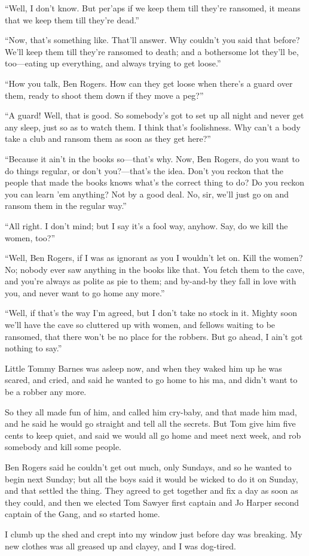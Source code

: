 \documentclass[10pt,a4paper]{article}
\begin{document}
“Well, I don’t know. But per’aps if we keep them till they’re ransomed, it means that we keep them till they’re dead.”

“Now, that’s something like. That’ll answer. Why couldn’t you said that before? We’ll keep them till they’re ransomed to death; and a bothersome lot they’ll be, too—eating up everything, and always trying to get loose.”

“How you talk, Ben Rogers. How can they get loose when there’s a guard over them, ready to shoot them down if they move a peg?”

“A guard! Well, that is good. So somebody’s got to set up all night and never get any sleep, just so as to watch them. I think that’s foolishness. Why can’t a body take a club and ransom them as soon as they get here?”

“Because it ain’t in the books so—that’s why. Now, Ben Rogers, do you want to do things regular, or don’t you?—that’s the idea. Don’t you reckon that the people that made the books knows what’s the correct thing to do? Do you reckon you can learn ’em anything? Not by a good deal. No, sir, we’ll just go on and ransom them in the regular way.”

“All right. I don’t mind; but I say it’s a fool way, anyhow. Say, do we kill the women, too?”

“Well, Ben Rogers, if I was as ignorant as you I wouldn’t let on. Kill the women? No; nobody ever saw anything in the books like that. You fetch them to the cave, and you’re always as polite as pie to them; and by-and-by they fall in love with you, and never want to go home any more.”

“Well, if that’s the way I’m agreed, but I don’t take no stock in it. Mighty soon we’ll have the cave so cluttered up with women, and fellows waiting to be ransomed, that there won’t be no place for the robbers. But go ahead, I ain’t got nothing to say.”

Little Tommy Barnes was asleep now, and when they waked him up he was scared, and cried, and said he wanted to go home to his ma, and didn’t want to be a robber any more.

So they all made fun of him, and called him cry-baby, and that made him mad, and he said he would go straight and tell all the secrets. But Tom give him five cents to keep quiet, and said we would all go home and meet next week, and rob somebody and kill some people.

Ben Rogers said he couldn’t get out much, only Sundays, and so he wanted to begin next Sunday; but all the boys said it would be wicked to do it on Sunday, and that settled the thing. They agreed to get together and fix a day as soon as they could, and then we elected Tom Sawyer first captain and Jo Harper second captain of the Gang, and so started home.

I clumb up the shed and crept into my window just before day was breaking. My new clothes was all greased up and clayey, and I was dog-tired.
\end{document}
